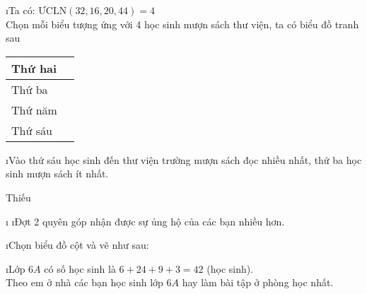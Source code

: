 \begin{Answer}{4}
		\begin{enumerate}[a),leftmargin=*]
			\i Ta có: ${\text{ƯCLN}}(32,16,20,44) = 4$\\
			Chọn mỗi biểu tượng  ứng với 4 học sinh mượn sách thư viện, ta có biểu đồ tranh sau
			\begin{center}
				\begin{tabular}{|l|l|}
					\hline
					Thứ hai&	\\
					\hline
					Thứ ba	&	\\
					\hline
					Thứ năm&	\\
					\hline
					Thứ sáu	&	\\
					\hline
				\end{tabular}
			\end{center}
			\i Vào thứ sáu học sinh đến thư viện trường mượn sách đọc nhiều nhất, thứ ba học sinh mượn sách ít nhất.
			
		\end{enumerate}
	
\end{Answer}
\begin{Answer}{5}
		Thiếu
	
\end{Answer}
\begin{Answer}{6}
		\begin{enumerate}[a),leftmargin=*]
			\i
			\i Đợt 2 quyên góp nhận được sự ủng hộ của các bạn nhiều hơn.
		\end{enumerate}
	
\end{Answer}
\begin{Answer}{7}
		\begin{enumerate}[a),leftmargin=*]
			\i Chọn biểu đồ cột và vẽ như sau:
			
			\i Lớp $6A$ có số học sinh là $6 + 24 + 9 + 3 = 42$  (học sinh).\\
			Theo em ở nhà các bạn học sinh lớp $6A$ hay làm bài tập ở phòng học nhất.
		\end{enumerate}
	
\end{Answer}
